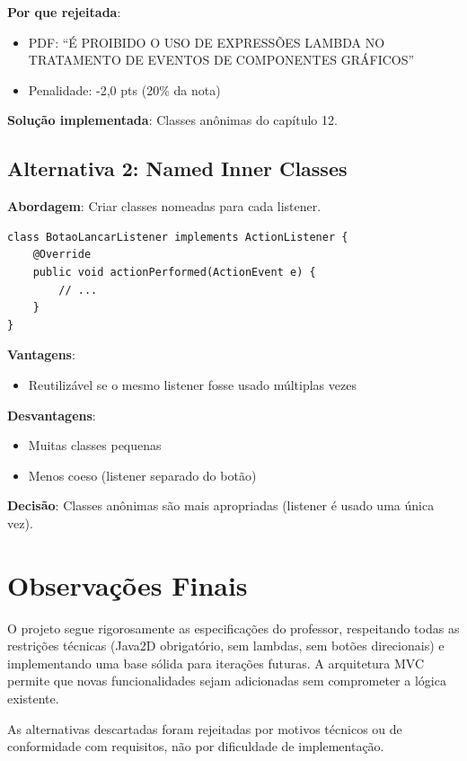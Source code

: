 \documentclass[12pt,a4paper]{report}
\begin{document}
\textbf{Por que rejeitada}:
\begin{itemize}
    \item PDF: ``É PROIBIDO O USO DE EXPRESSÕES LAMBDA NO TRATAMENTO DE EVENTOS DE COMPONENTES GRÁFICOS''
    \item Penalidade: -2,0 pts (20\% da nota)
\end{itemize}

\textbf{Solução implementada}: Classes anônimas do capítulo 12.

\subsection{Alternativa 2: Named Inner Classes}

\textbf{Abordagem}: Criar classes nomeadas para cada listener.

\begin{lstlisting}
class BotaoLancarListener implements ActionListener {
    @Override
    public void actionPerformed(ActionEvent e) {
        // ...
    }
}
\end{lstlisting}

\textbf{Vantagens}:
\begin{itemize}
    \item Reutilizável se o mesmo listener fosse usado múltiplas vezes
\end{itemize}

\textbf{Desvantagens}:
\begin{itemize}
    \item Muitas classes pequenas
    \item Menos coeso (listener separado do botão)
\end{itemize}

\textbf{Decisão}: Classes anônimas são mais apropriadas (listener é usado uma única vez).

\section{Observações Finais}

O projeto segue rigorosamente as especificações do professor, respeitando todas as restrições técnicas (Java2D obrigatório, sem lambdas, sem botões direcionais) e implementando uma base sólida para iterações futuras. A arquitetura MVC permite que novas funcionalidades sejam adicionadas sem comprometer a lógica existente.

As alternativas descartadas foram rejeitadas por motivos técnicos ou de conformidade com requisitos, não por dificuldade de implementação.
\end{document}

